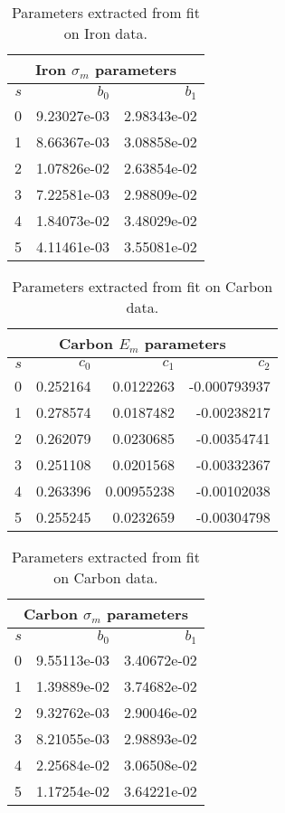 \begin{table}[!ht]
\centering
\begin{tabular}{|r|r|r|}
\multicolumn{3}{c}{Iron $\sigma_{m}$ parameters} \\ \hline
$s$ &$b_0$ & $b_1$ \\ \hline
0 & 9.23027e-03 & 2.98343e-02\\ \hline
1 & 8.66367e-03 & 3.08858e-02\\ \hline
2 & 1.07826e-02 & 2.63854e-02\\ \hline
3 & 7.22581e-03 & 2.98809e-02\\ \hline
4 & 1.84073e-02 & 3.48029e-02\\ \hline
5 & 4.11461e-03 & 3.55081e-02\\ \hline
\end{tabular}
\caption{Parameters extracted from fit on Iron data. \cite{Taya_thesis}}
\label{tb:sf_Fe_s}
\end{table}
%
\begin{table}[!ht]
\centering
\begin{tabular}{|r|r|r|r|}
\multicolumn{4}{c}{Carbon $E_{m}$ parameters} \\ \hline
$s$ &$c_0$ & $c_1$ & $c_2$\\ \hline \hline
0 & 0.252164 & 0.0122263 & -0.000793937\\ \hline
1 & 0.278574 & 0.0187482 & -0.00238217\\ \hline
2 & 0.262079 & 0.0230685 & -0.00354741\\ \hline
3 & 0.251108 & 0.0201568 & -0.00332367\\ \hline
4 & 0.263396 & 0.00955238 & -0.00102038\\ \hline
5 & 0.255245 & 0.0232659 & -0.00304798\\ \hline
\end{tabular}
\caption{Parameters extracted from fit on Carbon data. \cite{Taya_thesis}}
\label{tb:sf_C_m}
\end{table}
%
\begin{table}[!ht]
\centering
\begin{tabular}{|r|r|r|}
\multicolumn{3}{c}{Carbon $\sigma_{m}$ parameters} \\ \hline
$s$ &$b_0$ & $b_1$ \\ \hline
0 & 9.55113e-03 & 3.40672e-02\\ \hline
1 & 1.39889e-02 & 3.74682e-02\\ \hline
2 & 9.32762e-03 & 2.90046e-02\\ \hline
3 & 8.21055e-03 & 2.98893e-02\\ \hline
4 & 2.25684e-02 & 3.06508e-02\\ \hline
5 & 1.17254e-02 & 3.64221e-02\\ \hline
\end{tabular}
\caption{Parameters extracted from fit on Carbon data. \cite{Taya_thesis}}
\label{tb:sf_C_s}
\end{table}
